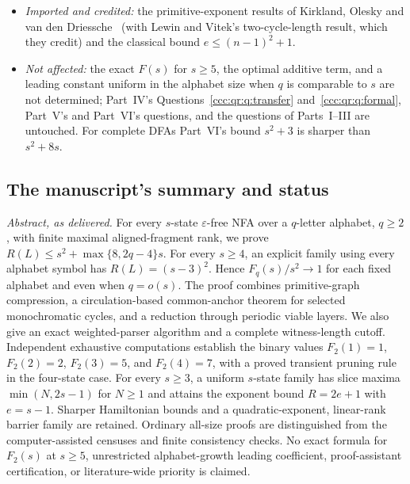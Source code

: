 \documentclass[11pt,letterpaper]{article}
\theoremstyle{definition}
\theoremstyle{remark}
\newcommand{\eps}{\varepsilon}
\begin{document}
\begin{itemize}[leftmargin=1.4em,itemsep=1pt]
 Part~IV's Theorem~\ref{ccc:qr:thm:main}, and the manuscript says so;
 Lemma~\ref{ccc:sc:lem:greedy}, the parser after it and the periodic-middle
 graph are Part~V's (second proof kept).
\item \emph{Imported and credited:} the primitive-exponent results of
 Kirkland, Olesky and van den Driessche~\cite{KOV} (with Lewin and Vitek's
 two-cycle-length result, which they credit) and the classical bound
 $e\le(n-1)^2+1$.
\item \emph{Not affected:} the exact $F(s)$ for $s\ge5$, the optimal additive
 term, and a leading constant uniform in the alphabet size when $q$ is
 comparable to $s$ are not determined; Part~IV's
 Questions~\ref{ccc:qr:q:transfer} and~\ref{ccc:qr:q:formal}, Part~V's and
 Part~VI's questions, and the questions of Parts~I--III are untouched. For
 complete DFAs Part~VI's bound $s^2+3$ is sharper than $s^2+8s$.
\end{itemize}

\subsection{The manuscript's summary and status}\label{ccc:sc:sec:abstract}

\emph{Abstract, as delivered.} For every $s$-state $\eps$-free NFA over a
$q$-letter alphabet, $q\ge2$, with finite maximal aligned-fragment rank, we
prove $R(L)\le s^2+\max\{8,2q-4\}s$. For every $s\ge4$, an explicit family
using every alphabet symbol has $R(L)=(s-3)^2$. Hence $F_q(s)/s^2\to1$ for
each fixed alphabet and even when $q=o(s)$. The proof combines
primitive-graph compression, a circulation-based common-anchor theorem for
selected monochromatic cycles, and a reduction through periodic viable
layers. We also give an exact weighted-parser algorithm and a complete
witness-length cutoff. Independent exhaustive computations establish the
binary values $F_2(1)=1$, $F_2(2)=2$, $F_2(3)=5$, and $F_2(4)=7$, with a
proved transient pruning rule in the four-state case. For every $s\ge3$, a
uniform $s$-state family has slice maxima $\min(N,2s-1)$ for $N\ge1$ and
attains the exponent bound $R=2e+1$ with $e=s-1$. Sharper Hamiltonian bounds
and a quadratic-exponent, linear-rank barrier family are retained. Ordinary
all-size proofs are distinguished from the computer-assisted censuses and
finite consistency checks. No exact formula for $F_2(s)$ at $s\ge5$,
unrestricted alphabet-growth leading coefficient, proof-assistant
certification, or literature-wide priority is claimed.
\end{document}
